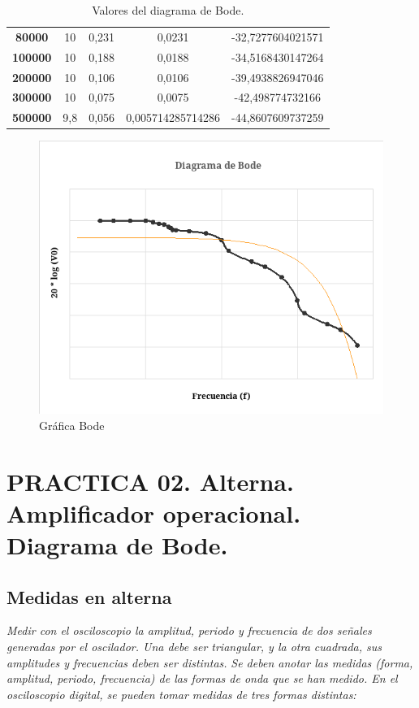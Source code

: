 \documentclass[paper=a4, fontsize=11pt]{scrartcl} %
\numberwithin{equation}{section} %
\numberwithin{figure}{section} %
\numberwithin{table}{section} %
\begin{document}
\begin{table}[H]
\begin{tabular}{|c|c|c|c|c|}
			\textbf{80000} &   10  & 0,231   & 0,0231 &-32,7277604021571 \\
			\textbf{100000} &  10  & 0,188   & 0,0188 &-34,5168430147264 \\
			\textbf{200000} &  10  & 0,106   & 0,0106 &-39,4938826947046 \\
			\textbf{300000} &  10  & 0,075   & 0,0075 &-42,498774732166 \\
			\textbf{500000} &  9,8 & 0,056   & 0,005714285714286  &-44,8607609737259 \\
		\hline			
	\end{tabular}
	\caption{Valores del diagrama de Bode. \cite{IA}} \label{Bode}
\end{table}

\begin{figure}[H]
	\centering
	\includegraphics[scale=1]{image/diagrama-bode}
	\caption{Gráfica Bode \cite{IA}}
	\label{fig:diagrama-bode}
\end{figure}

\newpage

\section{PRACTICA 02. Alterna. Amplificador operacional. Diagrama de Bode. \cite{IV}}

\subsection{Medidas en alterna}

\textit{Medir con el osciloscopio la amplitud, periodo y frecuencia de dos señales generadas por el oscilador. Una debe ser triangular, y la otra cuadrada, sus amplitudes y frecuencias deben ser distintas.} \newline
\textit{Se deben anotar las medidas (forma, amplitud, periodo, frecuencia) de las formas de onda que se han medido. En el osciloscopio digital, se pueden tomar medidas de tres formas distintas:}
\end{document}
